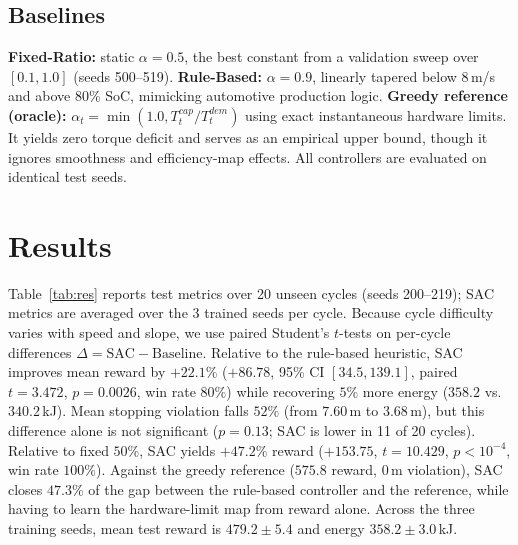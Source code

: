 \documentclass[10pt,twocolumn,letterpaper]{article}
\begin{document}
\subsection{Baselines}
\textbf{Fixed-Ratio:} static $\alpha=0.5$, the best constant from a validation sweep over $[0.1, 1.0]$ (seeds 500--519).
\textbf{Rule-Based:} $\alpha=0.9$, linearly tapered below 8\,m/s and above 80\% SoC, mimicking automotive production logic.
\textbf{Greedy reference (oracle):} $\alpha_t = \min(1.0, T^{cap}_t / T^{dem}_t)$ using exact instantaneous hardware limits. It yields zero torque deficit and serves as an empirical upper bound, though it ignores smoothness and efficiency-map effects. All controllers are evaluated on identical test seeds.

\section{Results}
Table~\ref{tab:res} reports test metrics over 20 unseen cycles (seeds 200--219); SAC metrics are averaged over the 3 trained seeds per cycle.
Because cycle difficulty varies with speed and slope, we use paired Student's $t$-tests on per-cycle differences $\Delta = \mathrm{SAC} - \mathrm{Baseline}$.
Relative to the rule-based heuristic, SAC improves mean reward by $+22.1\%$ ($+86.78$, 95\% CI $[34.5,139.1]$, paired $t=3.472$, $p=0.0026$, win rate $80\%$) while recovering $5\%$ more energy ($358.2$ vs.\ $340.2$\,kJ). Mean stopping violation falls $52\%$ (from $7.60$\,m to $3.68$\,m), but this difference alone is not significant ($p=0.13$; SAC is lower in 11 of 20 cycles).
Relative to fixed $50\%$, SAC yields $+47.2\%$ reward ($+153.75$, $t=10.429$, $p<10^{-4}$, win rate $100\%$).
Against the greedy reference ($575.8$ reward, 0\,m violation), SAC closes $47.3\%$ of the gap between the rule-based controller and the reference, while having to learn the hardware-limit map from reward alone.
Across the three training seeds, mean test reward is $479.2 \pm 5.4$ and energy $358.2 \pm 3.0$\,kJ.

\begin{table}[t]
\centering\footnotesize\setlength{\tabcolsep}{2pt}
\caption{Test performance (mean $\pm$ std over 20 test cycles; best practical method in bold; greedy reference is an empirical upper bound).}\label{tab:res}
\end{table}
\end{document}
